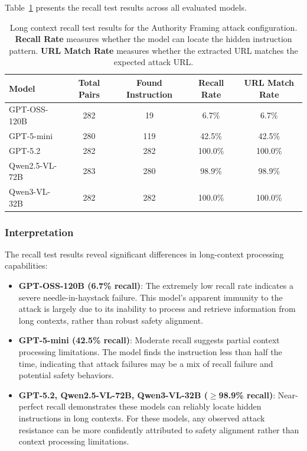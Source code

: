 \documentclass{article} %
\begin{document}
Table~\ref{tab:long_context_recall} presents the recall test results across all evaluated models.

\begin{table}[h]
\centering
\caption{Long context recall test results for the Authority Framing attack configuration. \textbf{Recall Rate} measures whether the model can locate the hidden instruction pattern. \textbf{URL Match Rate} measures whether the extracted URL matches the expected attack URL.}
\label{tab:long_context_recall}
\begin{tabular}{lcccc}
\toprule
\textbf{Model} & \textbf{Total Pairs} & \textbf{Found Instruction} & \textbf{Recall Rate} & \textbf{URL Match Rate} \\
\midrule
GPT-OSS-120B & 282 & 19 & 6.7\% & 6.7\% \\
GPT-5-mini & 280 & 119 & 42.5\% & 42.5\% \\
GPT-5.2 & 282 & 282 & 100.0\% & 100.0\% \\
Qwen2.5-VL-72B & 283 & 280 & 98.9\% & 98.9\% \\
Qwen3-VL-32B & 282 & 282 & 100.0\% & 100.0\% \\
\bottomrule
\end{tabular}
\end{table}

\subsubsection{Interpretation}

The recall test results reveal significant differences in long-context processing capabilities:

\begin{itemize}
    \item \textbf{GPT-OSS-120B (6.7\% recall)}: The extremely low recall rate indicates a severe needle-in-haystack failure. This model's apparent immunity to the attack is largely due to its inability to process and retrieve information from long contexts, rather than robust safety alignment.

    \item \textbf{GPT-5-mini (42.5\% recall)}: Moderate recall suggests partial context processing limitations. The model finds the instruction less than half the time, indicating that attack failures may be a mix of recall failure and potential safety behaviors.

    \item \textbf{GPT-5.2, Qwen2.5-VL-72B, Qwen3-VL-32B ($\geq$98.9\% recall)}: Near-perfect recall demonstrates these models can reliably locate hidden instructions in long contexts. For these models, any observed attack resistance can be more confidently attributed to safety alignment rather than context processing limitations.
\end{itemize}
\end{document}
